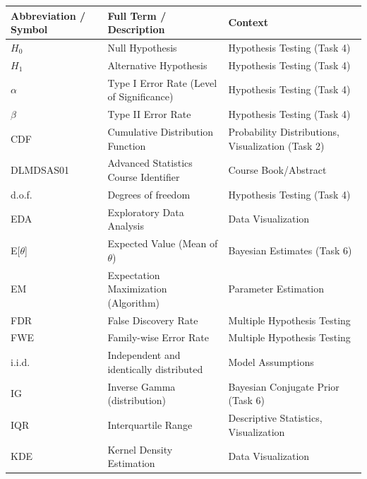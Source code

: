 \begin{tabular}{ | m{2.1cm} | m{7cm}| m{7cm} | }
\hline
Abbreviation / Symbol & Full Term / Description & Context \\
\hline
$H_0$ & Null Hypothesis & Hypothesis Testing (Task 4) \\ \hline
$H_1$ & Alternative Hypothesis & Hypothesis Testing (Task 4) \\ \hline
$\alpha$ & Type I Error Rate (Level of Significance) & Hypothesis Testing (Task 4) \\ \hline
$\beta$ & Type II Error Rate & Hypothesis Testing (Task 4) \\ \hline
CDF & Cumulative Distribution Function & Probability Distributions, Visualization (Task 2) \\ \hline
DLMDSAS01 & Advanced Statistics Course Identifier & Course Book/Abstract \\ \hline
d.o.f. & Degrees of freedom & Hypothesis Testing (Task 4) \\ \hline
EDA & Exploratory Data Analysis & Data Visualization \\ \hline
E[$\theta$] & Expected Value (Mean of $\theta$) & Bayesian Estimates (Task 6) \\ \hline
EM & Expectation Maximization (Algorithm) & Parameter Estimation \\ \hline
FDR & False Discovery Rate & Multiple Hypothesis Testing \\ \hline
FWE & Family-wise Error Rate & Multiple Hypothesis Testing \\ \hline
i.i.d. & Independent and identically distributed & Model Assumptions \\ \hline
IG & Inverse Gamma (distribution) & Bayesian Conjugate Prior (Task 6) \\ \hline
IQR & Interquartile Range & Descriptive Statistics, Visualization \\ \hline
KDE & Kernel Density Estimation & Data Visualization \\ \hline

\end{tabular}
